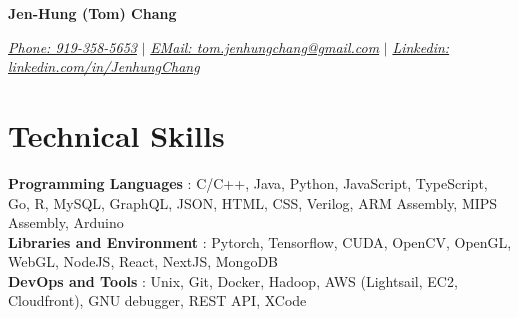 \documentclass[letterpaper,11pt]{article}
\newcommand{\namespace}{
\vspace{3pt}
}
\newcommand{\sectionspace}{
\vspace{-20pt}
}
\newcommand{\subheadingtitlevspace}{
\vspace{-3pt}
}
\newcommand{\titleItem}[1]{
  \textbf{#1}
}
\begin{document}
\begin{center}
    \textbf{\Huge{\center Jen-Hung (Tom) Chang }} \\
    \namespace
    \href{tel: 9193585653}{{\textit{Phone: 919-358-5653}}} \qquad $|$ 
    \href{mailto:tom.jenhungchang@gmail.com}{{\textit{EMail: tom.jenhungchang@gmail.com}}} \qquad $|$ 
    \href{https://linkedin.com/in/JenhungChang}{{\textit{Linkedin: linkedin.com/in/JenhungChang}}}
    \vspace{-8pt}
\end{center}



    

\section{Technical Skills}
\subheadingtitlevspace
  \begin{itemize}[leftmargin=0in, label={}]
    {\item{
      \titleItem{Programming Languages}{: C/C++, Java, Python, JavaScript, TypeScript, Go, R, MySQL, GraphQL, JSON, HTML, CSS, Verilog, ARM Assembly, MIPS Assembly, Arduino} \\
      \titleItem{Libraries and Environment}{: Pytorch, Tensorflow, CUDA, OpenCV, OpenGL, WebGL, NodeJS, React, NextJS, MongoDB} \\
      \titleItem{DevOps and Tools}{: Unix, Git, Docker, Hadoop, AWS (Lightsail, EC2, Cloudfront), GNU debugger, REST API, XCode} \\
    }}
  \end{itemize}
\sectionspace
\end{document}
